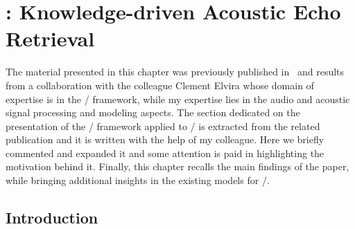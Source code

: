 \chapter{: Knowledge-driven Acoustic Echo Retrieval}\label{ch:blaster}

\vspace{-2.5em}
  \synopsisChBlaster

\mynewline
The material presented in this chapter was previously published in~\cite{di2020blaster} and results from a collaboration with the colleague Clement Elvira whose domain of expertise is in the \CDdef/ framework, while my expertise lies in the audio and acoustic signal processing and modeling aspects.
The section dedicated on the presentation of the \CD/ framework applied to \AER/ is extracted from the related publication and it is written with the help of my colleague.
Here we briefly commented and expanded it and some attention is paid in highlighting the motivation behind it.
Finally, this chapter recalls the main findings of the paper, while bringing additional insights in the existing models for \AER/.

\section{Introduction}
\label{sec:blaster:intro}

